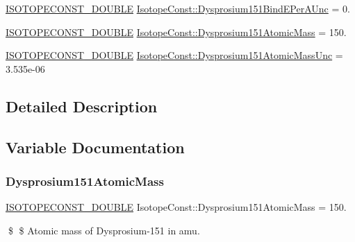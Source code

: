 \begin{DoxyCompactItemize}
\item 
\mbox{\hyperlink{group___isotope_const-_macros_ga8f45a7272ce02c0b4c65c44636ed719a}{I\+S\+O\+T\+O\+P\+E\+C\+O\+N\+S\+T\+\_\+\+D\+O\+U\+B\+LE}} \mbox{\hyperlink{group___isotope_const-_dysprosium-_dy151_gaaae676646c5ebbd2c68e343aac071595}{Isotope\+Const\+::\+Dysprosium151\+Bind\+E\+Per\+A\+Unc}} = 0.
\item 
\mbox{\hyperlink{group___isotope_const-_macros_ga8f45a7272ce02c0b4c65c44636ed719a}{I\+S\+O\+T\+O\+P\+E\+C\+O\+N\+S\+T\+\_\+\+D\+O\+U\+B\+LE}} \mbox{\hyperlink{group___isotope_const-_dysprosium-_dy151_gad83ea6065ad908540df82ea860fbadf3}{Isotope\+Const\+::\+Dysprosium151\+Atomic\+Mass}} = 150.
\item 
\mbox{\hyperlink{group___isotope_const-_macros_ga8f45a7272ce02c0b4c65c44636ed719a}{I\+S\+O\+T\+O\+P\+E\+C\+O\+N\+S\+T\+\_\+\+D\+O\+U\+B\+LE}} \mbox{\hyperlink{group___isotope_const-_dysprosium-_dy151_ga3bb408d0f915675e27c3d28347af4e35}{Isotope\+Const\+::\+Dysprosium151\+Atomic\+Mass\+Unc}} = 3.\+535e-\/06
\end{DoxyCompactItemize}


\subsection{Detailed Description}


\subsection{Variable Documentation}
\mbox{\label{group___isotope_const-_dysprosium-_dy151_gad83ea6065ad908540df82ea860fbadf3}} 
\subsubsection{\texorpdfstring{Dysprosium151\+Atomic\+Mass}{Dysprosium151AtomicMass}}
{\footnotesize\ttfamily \mbox{\hyperlink{group___isotope_const-_macros_ga8f45a7272ce02c0b4c65c44636ed719a}{I\+S\+O\+T\+O\+P\+E\+C\+O\+N\+S\+T\+\_\+\+D\+O\+U\+B\+LE}} Isotope\+Const\+::\+Dysprosium151\+Atomic\+Mass = 150.}

\$ \$ Atomic mass of Dysprosium-\/151 in amu. \mbox{\label{group___isotope_const-_dysprosium-_dy151_ga3bb408d0f915675e27c3d28347af4e35}} 
